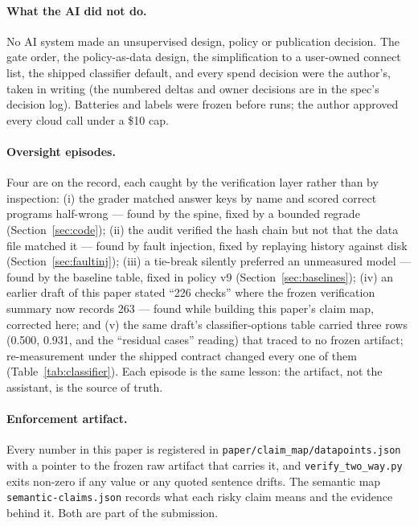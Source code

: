 \documentclass[11pt]{article}
\newcommand{\code}[1]{\texttt{#1}}
\begin{document}
\paragraph{What the AI did not do.} No AI system made an unsupervised design, policy or
publication decision. The gate order, the policy-as-data design, the simplification to a
user-owned connect list, the shipped classifier default, and every spend decision were the
author's, taken in writing (the numbered deltas and owner decisions are in the spec's decision
log). Batteries and labels were frozen before runs; the author approved every cloud call under a
\$10 cap.

\paragraph{Oversight episodes.} Four are on the record, each caught by the verification layer
rather than by inspection: (i) the grader matched answer keys by name and scored correct
programs half-wrong --- found by the spine, fixed by a bounded regrade (Section~\ref{sec:code});
(ii) the audit verified the hash chain but not that the data file matched it --- found by fault
injection, fixed by replaying history against disk (Section~\ref{sec:faultinj});
(iii) a tie-break silently
preferred an unmeasured model --- found by the baseline table, fixed in policy v9
(Section~\ref{sec:baselines}); (iv) an earlier draft of this paper stated ``226 checks'' where the frozen
verification summary now records 263 --- found while building this paper's claim map, corrected
here; and (v) the same draft's classifier-options table carried three rows (0.500, 0.931, and the
``residual cases'' reading) that traced to no frozen artifact; re-measurement under the shipped
contract changed every one of them (Table~\ref{tab:classifier}). Each episode is the same lesson: the artifact, not the assistant, is the source of truth.

\paragraph{Enforcement artifact.} Every number in this paper is registered in
\code{paper/claim\_map/datapoints.json} with a pointer to the frozen raw artifact that carries
it, and \code{verify\_two\_way.py} exits non-zero if any value or any quoted sentence drifts.
The semantic map \code{semantic-claims.json} records what each risky claim means and the
evidence behind it. Both are part of the submission.
\end{document}
